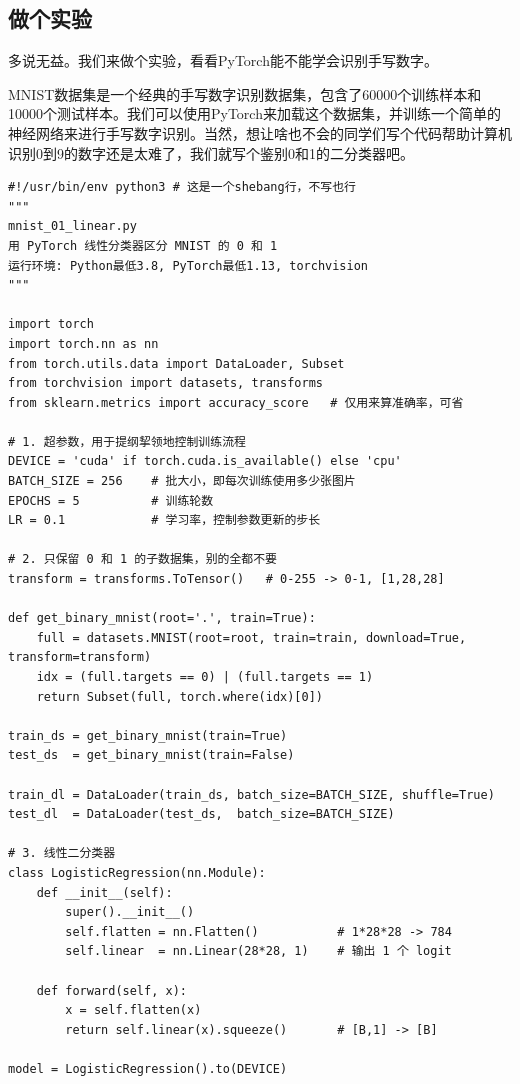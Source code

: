 \subsection{做个实验}

多说无益。我们来做个实验，看看PyTorch能不能学会识别手写数字。

MNIST数据集是一个经典的手写数字识别数据集，包含了60000个训练样本和10000个测试样本。我们可以使用PyTorch来加载这个数据集，并训练一个简单的神经网络来进行手写数字识别。当然，想让啥也不会的同学们写个代码帮助计算机识别0到9的数字还是太难了，我们就写个鉴别0和1的二分类器吧。

\begin{verbatim}
#!/usr/bin/env python3 # 这是一个shebang行，不写也行
"""
mnist_01_linear.py
用 PyTorch 线性分类器区分 MNIST 的 0 和 1
运行环境: Python最低3.8, PyTorch最低1.13, torchvision
"""

import torch
import torch.nn as nn
from torch.utils.data import DataLoader, Subset
from torchvision import datasets, transforms
from sklearn.metrics import accuracy_score   # 仅用来算准确率，可省

# 1. 超参数，用于提纲挈领地控制训练流程
DEVICE = 'cuda' if torch.cuda.is_available() else 'cpu'
BATCH_SIZE = 256    # 批大小，即每次训练使用多少张图片
EPOCHS = 5          # 训练轮数
LR = 0.1            # 学习率，控制参数更新的步长

# 2. 只保留 0 和 1 的子数据集，别的全都不要
transform = transforms.ToTensor()   # 0-255 -> 0-1, [1,28,28]

def get_binary_mnist(root='.', train=True):
    full = datasets.MNIST(root=root, train=train, download=True, transform=transform)
    idx = (full.targets == 0) | (full.targets == 1)
    return Subset(full, torch.where(idx)[0])

train_ds = get_binary_mnist(train=True)
test_ds  = get_binary_mnist(train=False)

train_dl = DataLoader(train_ds, batch_size=BATCH_SIZE, shuffle=True)
test_dl  = DataLoader(test_ds,  batch_size=BATCH_SIZE)

# 3. 线性二分类器
class LogisticRegression(nn.Module):
    def __init__(self):
        super().__init__()
        self.flatten = nn.Flatten()           # 1*28*28 -> 784
        self.linear  = nn.Linear(28*28, 1)    # 输出 1 个 logit

    def forward(self, x):
        x = self.flatten(x)
        return self.linear(x).squeeze()       # [B,1] -> [B]

model = LogisticRegression().to(DEVICE)


\end{verbatim}
